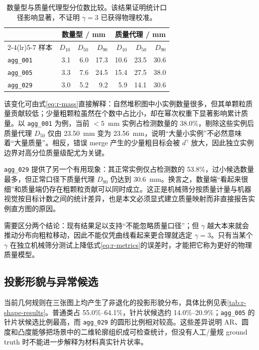 \begin{table}[t]
\centering
\caption{数量型与质量代理型分位数比较。该结果证明统计口径影响显著，不证明 $\gamma=3$ 已获得物理校准。}
\label{tab:r-number-mass}
\footnotesize
\renewcommand{\arraystretch}{1.12}
\begin{tabular}{lrrrrrr}
\toprule
& \multicolumn{3}{c}{数量型 / mm} & \multicolumn{3}{c}{质量代理 / mm} \\
\cmidrule(lr){2-4}\cmidrule(lr){5-7}
样本 & $D_{10}$ & $D_{50}$ & $D_{90}$ & $D_{10}$ & $D_{50}$ & $D_{90}$ \\
\midrule
\texttt{agg\_001} & 3.1 & 6.0 & 17.3 & 10.6 & 23.5 & 30.6 \\
\texttt{agg\_005} & 3.3 & 7.6 & 24.5 & 15.4 & 27.5 & 38.0 \\
\texttt{agg\_029} & 3.0 & 5.2 & 9.2 & 5.9 & 14.1 & 30.6 \\
\bottomrule
\end{tabular}
\end{table}

该变化可由式\eqref{eq:r-mass}直接解释：自然堆积图中小实例数量很多，但其单颗粒质量贡献较低；少量粗颗粒虽然在个数中占比小，却在幂次权重下显著影响累计质量。以 \texttt{agg\_001} 为例，当前 $<5$~mm 实例占检测数量的 38.0\%，剔除这些实例后质量代理 $D_{50}$ 仅由 23.50~mm 变为 23.56~mm，说明“大量小实例”不必然意味着“大量质量”。相反，错误 merge 产生的少量粗目标会被 $d^{\gamma}$ 放大，因此独立实例边界对高分位质量级配尤为关键。

\texttt{agg\_029} 提供了另一个有用现象：其正常实例仅占检测数的 53.8\%，过小候选数量最多，但正常口径下质量代理 $D_{90}$ 仍达到 30.6~mm。换言之，数量端“看起来很细”和质量端仍存在粗颗粒贡献可以同时成立。这正是机械筛分按质量计量与机器视觉按目标计数之间的统计差异，也是本文必须显式建立质量映射而非直接报告实例直方图的原因。

需要区分两个结论：现有结果足以支持“不能忽略质量口径”；但 $\gamma$ 越大本来就会推动分布向粗粒移动，因此不能仅凭曲线看起来更合理就选定 $\gamma=3$。只有当某个 $\gamma$ 在独立机械筛分测试上降低式\eqref{eq:r-metrics}的误差时，才能把它称为更好的物理质量模型。

\subsection{投影形貌与异常候选}

当前几何规则在三张图上均产生了非退化的投影形貌分布，具体比例见表\ref{tab:r-shape-results}。普通类占 55.0\%--64.1\%，针片状候选约 14.0\%--20.9\%；\texttt{agg\_005} 的针片状候选比例最高，而 \texttt{agg\_029} 的圆形比例相对较高。这些差异说明 AR、圆度和凸度能够把场景中的二维轮廓组织成可检查统计，但没有人工/量规 ground truth 时不能进一步解释为材料真实针片状率。

